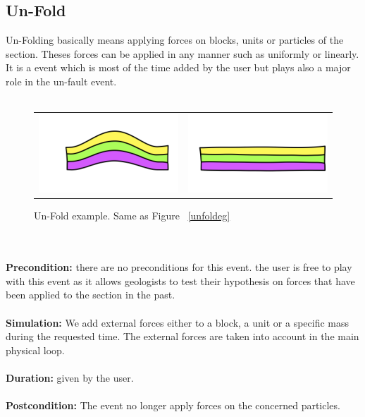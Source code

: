 \documentclass[12pt, a4paper]{report} %
\begin{document}
\subsection{Un-Fold}
\label{sub:unfold}
Un-Folding basically means applying forces on blocks, units or particles of the section. Theses forces can be applied in any manner such as uniformly or linearly. It is a event which is most of the time added by the user but plays also a major role in the un-fault event.\\\\
\begin{figure}[htb]
\centering
\begin{tabular}{@{}cc@{}}
\includegraphics[width=.35\textwidth]{unFoldDescription0.png}&
\includegraphics[width=.35\textwidth]{unFoldDescription1.png}\\
\end{tabular}
\caption{Un-Fold example. Same as Figure ~\ref{unfoldeg}}
\label{unfoldeg2}
\end{figure}\\\\
\textbf{Precondition:} there are no preconditions for this event. the user is free to play with this event as it allows geologists to test their hypothesis on forces that have been applied to the section in the past.\\\\
\textbf{Simulation:} We add external forces either to a block, a unit or a specific mass during the requested time. The external forces are taken into account in the main physical loop.\\\\
\textbf{Duration:} given by the user.\\\\
\textbf{Postcondition:} The event no longer apply forces on the concerned particles.\\\\
\end{document}
